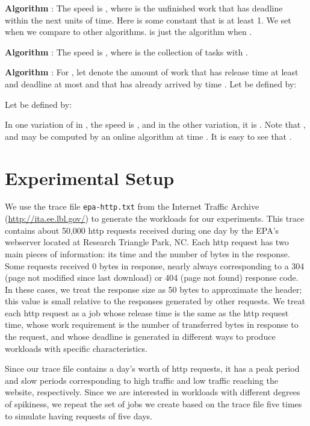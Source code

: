 \documentclass[11pt]{article}
\begin{document}
\medskip
\noindent
{\bf Algorithm \boldmath\unboldmath} \cite{qOA}:
The speed is , where
 is the unfinished work that has deadline within the next  
units of time. Here  is some constant that is at least 1. 
We set  when we compare  to other algorithms.  is
just the algorithm  when .

\medskip
\noindent
{\bf Algorithm \boldmath\unboldmath} \cite{YDS}:
The speed is
,
where  is the collection of tasks  with .
\medskip


\medskip
\noindent
{\bf Algorithm \boldmath\unboldmath} \cite{BKP}:
For , let  denote the amount of work that 
has release time at least
 and deadline at most  and that has already arrived by time .
Let  be defined by:

Let  be defined by:

In one variation of  in \cite{BKP}, the speed is , and in the other variation, it is
. 
Note that ,  and  may be computed by
an online algorithm at time .
It is easy to see that . 





\section{Experimental Setup}
\label{sec:setup} 


We use the trace file {\tt epa-http.txt} from the Internet Traffic
Archive (\url{http://ita.ee.lbl.gov/}) to generate the workloads for
our experiments.
This trace contains about 50,000 http requests received during one day
by the EPA's webserver located at Research Triangle Park, NC.
Each http request has two main pieces of information: its time and
the number of bytes in the response.
Some requests received 0 bytes in response, nearly always
corresponding to a 304 (page not modified since last download) or 404
(page not found) response code.
In these cases, we treat the response size as 50 bytes to approximate
the header; this value is small relative to the responses generated by
other requests. 
We treat each http request as a job whose release time is the same as
the http request time, whose work requirement is the number of
transferred bytes in response to the request, and whose deadline is
generated in different ways to produce workloads with specific
characteristics.

Since our trace file contains a day's worth of http requests, it has a
peak period and slow periods corresponding to high traffic and low
traffic reaching the website, respectively.
Since we are
interested in workloads with different degrees of spikiness, we repeat
the set of jobs we create based on the trace file five times to
simulate having requests of five days.
\end{document}
